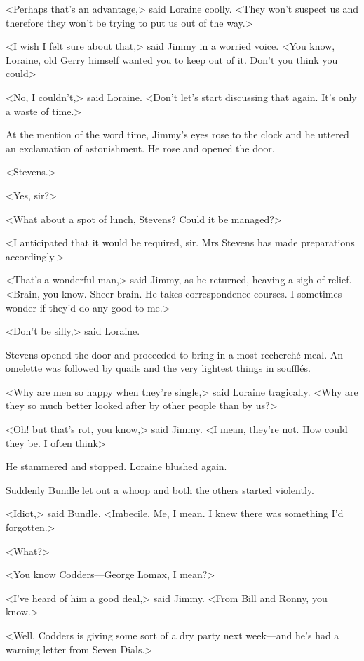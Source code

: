 <Perhaps that's an advantage,> said Loraine coolly. <They won't suspect us and therefore they won't be trying to put us out of the way.>

<I wish I felt sure about that,> said Jimmy in a worried voice. <You know, Loraine, old Gerry himself wanted you to keep out of it. Don't you think you could\longdash>

<No, I couldn't,> said Loraine. <Don't let's start discussing that again. It's only a waste of time.>

At the mention of the word time, Jimmy's eyes rose to the clock and he uttered an exclamation of astonishment. He rose and opened the door.

<Stevens.>

<Yes, sir?>

<What about a spot of lunch, Stevens? Could it be managed?>

<I anticipated that it would be required, sir. Mrs Stevens has made preparations accordingly.>

<That's a wonderful man,> said Jimmy, as he returned, heaving a sigh of relief. <Brain, you know. Sheer brain. He takes correspondence courses. I sometimes wonder if they'd do any good to me.>

<Don't be silly,> said Loraine.

Stevens opened the door and proceeded to bring in a most recherché meal. An omelette was followed by quails and the very lightest things in soufflés.

<Why are men so happy when they're single,> said Loraine tragically. <Why are they so much better looked after by other people than by us?>

<Oh! but that's rot, you know,> said Jimmy. <I mean, they're not. How could they be. I often think\longdash>

He stammered and stopped. Loraine blushed again.

Suddenly Bundle let out a whoop and both the others started violently.

<Idiot,> said Bundle. <Imbecile. Me, I mean. I knew there was something I'd forgotten.>

<What?>

<You know Codders—George Lomax, I mean?>

<I've heard of him a good deal,> said Jimmy. <From Bill and Ronny, you know.>

<Well, Codders is giving some sort of a dry party next week—and he's had a warning letter from Seven Dials.>

